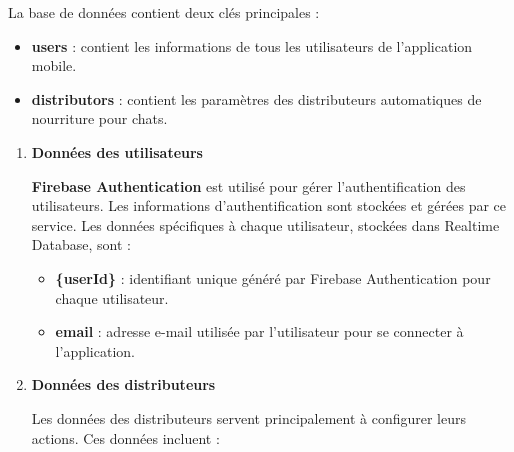 La base de données contient deux clés principales :

\begin{itemize}
\item \textbf{users} : contient les informations de tous les utilisateurs de l'application mobile.
\item \textbf{distributors} : contient les paramètres des distributeurs automatiques de nourriture pour chats.\\
\end{itemize}

\begin{enumerate}[label=\alph*)]
\item \textbf{Données des utilisateurs} 

\textbf{Firebase Authentication} est utilisé pour gérer l'authentification des utilisateurs. Les informations d'authentification sont stockées et gérées par ce service. Les données spécifiques à chaque utilisateur, stockées dans Realtime Database, sont :

\begin{itemize}
\item \textbf{\{userId\}} : identifiant unique généré par Firebase Authentication pour chaque utilisateur.
\item \textbf{email} : adresse e-mail utilisée par l'utilisateur pour se connecter à l'application.
\end{itemize}

\item \textbf{Données des distributeurs} 

Les données des distributeurs servent principalement à configurer leurs actions. Ces données incluent :


\end{enumerate}
